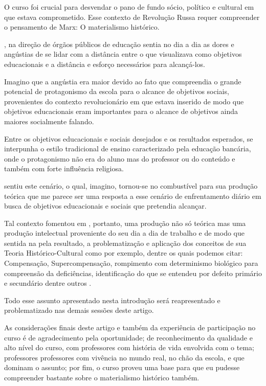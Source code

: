\documentclass{../../common-shared/cls/Article_Class_RevInfor}
\begin{document}
O curso foi crucial para desvendar o pano de fundo sócio, político e
cultural em que \Vig{} estava comprometido. Esse contexto de Revolução
Russa requer compreender o pensamento de Marx: O materialismo histórico.

\Vig{}, na direção de órgãos públicos de educação sentia
no dia a dia as dores e angústias de se lidar com a distância entre o que visualizava como objetivos
educacionais e a distância e esforço necessários para alcançá-los.

Imagino que a angústia era maior devido ao fato que \Vig{} compreendia o grande potencial de protagonismo da escola para o alcance de objetivos sociais, provenientes do contexto revolucionário em que estava inserido de modo que objetivos educacionais eram importantes para o alcance de objetivos ainda maiores socialmente falando.

Entre os objetivos educacionais e sociais desejados e os resultados esperados, se interpunha o estilo tradicional de ensino caracterizado pela educação bancária, onde o protagonismo não era do aluno mas do professor ou do conteúdo e também com forte influência religiosa.

\Vig{} sentiu este cenário, o qual, imagino, tornou-se no combustível
para sua produção teórica que me parece ser uma resposta a esse
cenário de enfrentamento diário em busca de objetivos educacionais e
sociais que pretendia alcançar.

Tal contexto fomentou em \Vig{}, portanto, uma produção não só teórica mas uma produção intelectual proveniente do seu dia a dia de trabalho e de modo que sentida na pela resultado, a problematização e aplicação dos conceitos de sua Teoria Histórico-Cultural como por exemplo, dentre os quais podemos citar: Compensação, Supercompensação, rompimento com determinismo biológico para compreensão da deficiências, identificação do que se entendeu
por defeito primário e secundário dentre outros \cite{dainez2014conceito,dainez2018concepcao}.

Todo esse assunto apresentado nesta introdução será reapresentado e
problematizado nas demais sessões deste artigo.

As considerações finais deste artigo e também da experiência de
participação no curso é de agradecimento pela oportunidade;
de reconhecimento da qualidade e alto nível do curso, com professores
com história de vida envolvida com o tema; professores professores com vivência no mundo real, no chão da escola, e que dominam
o assunto; por fim, o curso proveu uma base para que eu pudesse
compreender bastante sobre o materialismo histórico também.
\end{document}
